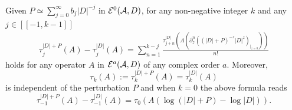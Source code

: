\documentclass[pdftex]{sigma}
\numberwithin{equation}{section}
\begin{document}
\begin{proposition}  Given  $P\simeq\sum\limits_{j=0}^\infty b_j   \vert D\vert^{-j}$ in $ {\cal E}^0({\cal A}, D)$, for any non-negative  integer $k$ and any
  $j\in[[-1,k-1]]$ \begin{gather}\label{eq:taujD1D2}\tau_j^{\vert D\vert +P}(A)-\tau_j^{\vert D\vert}(A)= \sum_{n=1}^{k-j}
\frac{\tau_{j+n}^{\vert D\vert}\left( A \left(\partial_z^n((\vert D\vert +P)^{-z} \vert
    D\vert^z)_{\vert_{z=0}}\right)\right)}{n!}
\end{gather}
holds for any  operator $A$ in $ {\cal E}^a({\cal A}, D)$ of any complex order $a$.
Moreover,
\[
\tau_k(A):= \tau_k^{\vert D\vert+P}(A)= \tau_k^{\vert D\vert}(A)
 \]
 is independent of the perturbation $P$ and when $k=0$ the
above
formula reads
\[
 \tau_{-1}^{\vert D\vert +P}(A)-\tau_{-1}^{\vert D\vert}(A)= \tau_{0}\left( A  \left(\log
   ( \vert D\vert+P) -\log \vert D\vert\right) \right).
   \]
\end{proposition}
\end{document}

